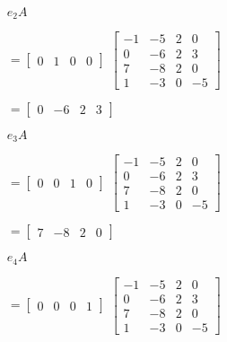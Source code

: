 \begin{enumerate}
\begin{description}
\begin{enumerate}
\end{enumerate}

\begin{enumerate} \item [$e_{2}A$]

$=\left[ \begin{array}{rrrr}
                       0&1&0&0\end{array} \right]$
$\left[ \begin{array}{rrrr}
                       -1&-5&2&0\\
                       0&-6&2&3\\
                       7&-8&2&0\\
                       1&-3&0&-5 \end{array} \right]$

$= \left[ \begin{array}{rrrr}
                        0&-6&2&3\end{array} \right]$

\end{enumerate}

\begin{enumerate} \item [$e_{3}A$]

$=\left[ \begin{array}{rrrr}
                       0&0&1&0\end{array} \right]$
$\left[ \begin{array}{rrrr}
                       -1&-5&2&0\\
                       0&-6&2&3\\
                       7&-8&2&0\\
                       1&-3&0&-5 \end{array} \right]$

$= \left[ \begin{array}{rrrr}
                        7&-8&2&0\end{array} \right]$

\end{enumerate}

\begin{enumerate} \item [$e_{4}A$]

$=\left[ \begin{array}{rrrr}
                       0&0&0&1\end{array} \right]$
$\left[ \begin{array}{rrrr}
                       -1&-5&2&0\\
                       0&-6&2&3\\
                       7&-8&2&0\\
                       1&-3&0&-5 \end{array} \right]$


\end{enumerate}
\end{description}
\end{enumerate}
